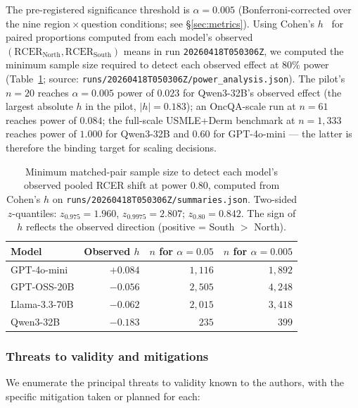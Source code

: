 The pre-registered significance threshold is $\alpha=0.005$ (Bonferroni-corrected over the nine region\,$\times$\,question conditions; see §\ref{sec:metrics}). Using Cohen's $h$~\cite{cohen1988} for paired proportions computed from each model's observed $(\text{RCER}_\text{North}, \text{RCER}_\text{South})$ means in run \texttt{20260418T050306Z}, we computed the minimum sample size required to detect each observed effect at $80\%$ power (Table~\ref{tab:power}; source: \texttt{runs/20260418T050306Z/power\_analysis.json}). The pilot's $n=20$ reaches $\alpha=0.005$ power of $0.023$ for Qwen3-32B's observed effect (the largest absolute $h$ in the pilot, $|h|=0.183$); an OncQA-scale run at $n=61$ reaches power of $0.084$; the full-scale USMLE+Derm benchmark at $n=1{,}333$ reaches power of $1.000$ for Qwen3-32B and $0.60$ for GPT-4o-mini --- the latter is therefore the binding target for scaling decisions.

\begin{table}[h]
\centering
\caption{Minimum matched-pair sample size to detect each model's observed pooled RCER shift at power $0.80$, computed from Cohen's $h$ on \texttt{runs/20260418T050306Z/summaries.json}. Two-sided $z$-quantiles: $z_{0.975}=1.960$, $z_{0.9975}=2.807$; $z_{0.80}=0.842$. The sign of $h$ reflects the observed direction (positive = South $>$ North).}
\label{tab:power}
\small
\begin{tabular}{lrrr}
\toprule
Model & Observed $h$ & $n$ for $\alpha=0.05$ & $n$ for $\alpha=0.005$ \\
\midrule
GPT-4o-mini     & $+0.084$ & $1{,}116$ & $1{,}892$ \\
GPT-OSS-20B     & $-0.056$ & $2{,}505$ & $4{,}248$ \\
Llama-3.3-70B   & $-0.062$ & $2{,}015$ & $3{,}418$ \\
Qwen3-32B       & $-0.183$ &   $235$  &   $399$  \\
\bottomrule
\end{tabular}
\end{table}

\subsubsection{Threats to validity and mitigations}

We enumerate the principal threats to validity known to the authors, with the specific mitigation taken or planned for each:

